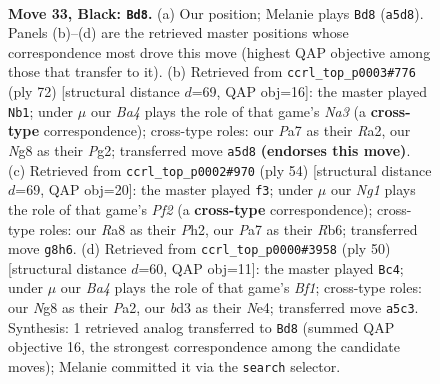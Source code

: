 \documentclass[11pt]{article}
\begin{document}
\clearpage

\begin{figure}[p]\centering
\begin{subfigure}{0.46\textwidth}\centering
\resizebox{\linewidth}{!}{%
\newchessgame
\chessboard[
  setfen={r5nr/p4k1p/8/b1p5/5B2/P2B3P/RPP3P1/1R4K1 b - - 1 33},
  showmover=false,
  pgfstyle=straightmove, color=movearrow, markmove={a5-d8}
]}
\caption{}
\end{subfigure}\hfill
\begin{subfigure}{0.46\textwidth}\centering
\resizebox{\linewidth}{!}{%
\newchessgame
\chessboard[
  setfen={1rr3k1/7p/6p1/P3p3/3bp3/N6P/R4PP1/5R1K w - - 0 37},
  showmover=false,
  pgfstyle=straightmove, color=movearrow, markmove={a3-b1}
]}
\caption{}
\end{subfigure}
\\[4pt]
\begin{subfigure}{0.46\textwidth}\centering
\resizebox{\linewidth}{!}{%
\newchessgame
\chessboard[
  setfen={5r1k/r4pp1/1R2p3/3bP3/8/3B4/3R1PPP/6K1 w - - 3 28},
  showmover=false,
  pgfstyle=straightmove, color=movearrow, markmove={f2-f3}
]}
\caption{}
\end{subfigure}\hfill
\begin{subfigure}{0.46\textwidth}\centering
\resizebox{\linewidth}{!}{%
\newchessgame
\chessboard[
  setfen={5r2/pb1k1prp/1p6/2pn4/4N3/5P2/PPP5/2K1RB1R w - - 2 26},
  showmover=false,
  pgfstyle=straightmove, color=movearrow, markmove={f1-c4}
]}
\caption{}
\end{subfigure}
\caption{\textbf{Move 33, Black: \texttt{Bd8}.} (a) Our position; Melanie plays \texttt{Bd8} (\texttt{a5d8}). Panels (b)--(d) are the retrieved master positions whose correspondence most drove this move (highest QAP objective among those that transfer to it). (b) Retrieved from \texttt{ccrl\_top\_p0003\#776} (ply 72) [structural distance $d$=69, QAP obj=16]: the master played \texttt{Nb1}; under $\mu$ our \emph{Ba4} plays the role of that game's \emph{Na3} (a \textbf{cross-type} correspondence); cross-type roles: our \emph{P}a7 as their \emph{R}a2, our \emph{N}g8 as their \emph{P}g2; transferred move \texttt{a5d8} \textbf{(endorses this move)}. (c) Retrieved from \texttt{ccrl\_top\_p0002\#970} (ply 54) [structural distance $d$=69, QAP obj=20]: the master played \texttt{f3}; under $\mu$ our \emph{Ng1} plays the role of that game's \emph{Pf2} (a \textbf{cross-type} correspondence); cross-type roles: our \emph{R}a8 as their \emph{P}h2, our \emph{P}a7 as their \emph{R}b6; transferred move \texttt{g8h6}. (d) Retrieved from \texttt{ccrl\_top\_p0000\#3958} (ply 50) [structural distance $d$=60, QAP obj=11]: the master played \texttt{Bc4}; under $\mu$ our \emph{Ba4} plays the role of that game's \emph{Bf1}; cross-type roles: our \emph{N}g8 as their \emph{P}a2, our \emph{b}d3 as their \emph{N}e4; transferred move \texttt{a5c3}. Synthesis: 1 retrieved analog transferred to \texttt{Bd8} (summed QAP objective 16, the strongest correspondence among the candidate moves); Melanie committed it via the \texttt{search} selector.}
\label{fig:thought-m65}
\end{figure}
\end{document}
